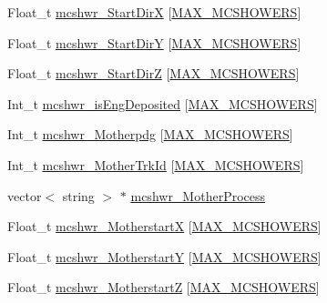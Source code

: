 \begin{DoxyCompactItemize}
\item 
Float\-\_\-t \hyperlink{classanatree_a5050cb067504527dce05bec84de07428}{mcshwr\-\_\-\-Start\-Dir\-X} \mbox{[}\hyperlink{anatree__core__v09410002_8h_ac14fc9ac3bf074dc1c2ab53cbd26449b}{M\-A\-X\-\_\-\-M\-C\-S\-H\-O\-W\-E\-R\-S}\mbox{]}
\item 
Float\-\_\-t \hyperlink{classanatree_ad3391ce32e4a90cdeb01c63329406b8d}{mcshwr\-\_\-\-Start\-Dir\-Y} \mbox{[}\hyperlink{anatree__core__v09410002_8h_ac14fc9ac3bf074dc1c2ab53cbd26449b}{M\-A\-X\-\_\-\-M\-C\-S\-H\-O\-W\-E\-R\-S}\mbox{]}
\item 
Float\-\_\-t \hyperlink{classanatree_ab1ff6e4ea73ecd3d03f175beedcc5cef}{mcshwr\-\_\-\-Start\-Dir\-Z} \mbox{[}\hyperlink{anatree__core__v09410002_8h_ac14fc9ac3bf074dc1c2ab53cbd26449b}{M\-A\-X\-\_\-\-M\-C\-S\-H\-O\-W\-E\-R\-S}\mbox{]}
\item 
Int\-\_\-t \hyperlink{classanatree_a8de3877a5bb9030ba734c43d767e1fd9}{mcshwr\-\_\-is\-Eng\-Deposited} \mbox{[}\hyperlink{anatree__core__v09410002_8h_ac14fc9ac3bf074dc1c2ab53cbd26449b}{M\-A\-X\-\_\-\-M\-C\-S\-H\-O\-W\-E\-R\-S}\mbox{]}
\item 
Int\-\_\-t \hyperlink{classanatree_ae3d5dea22be9d6c134892c5740d6e69a}{mcshwr\-\_\-\-Motherpdg} \mbox{[}\hyperlink{anatree__core__v09410002_8h_ac14fc9ac3bf074dc1c2ab53cbd26449b}{M\-A\-X\-\_\-\-M\-C\-S\-H\-O\-W\-E\-R\-S}\mbox{]}
\item 
Int\-\_\-t \hyperlink{classanatree_a1d2bbd71659519ca59c05097c92e8572}{mcshwr\-\_\-\-Mother\-Trk\-Id} \mbox{[}\hyperlink{anatree__core__v09410002_8h_ac14fc9ac3bf074dc1c2ab53cbd26449b}{M\-A\-X\-\_\-\-M\-C\-S\-H\-O\-W\-E\-R\-S}\mbox{]}
\item 
vector$<$ string $>$ $\ast$ \hyperlink{classanatree_a8eca5519b33722cef863970e40a1826a}{mcshwr\-\_\-\-Mother\-Process}
\item 
Float\-\_\-t \hyperlink{classanatree_aee48afcf4efb09f982471bc1a7c63680}{mcshwr\-\_\-\-Motherstart\-X} \mbox{[}\hyperlink{anatree__core__v09410002_8h_ac14fc9ac3bf074dc1c2ab53cbd26449b}{M\-A\-X\-\_\-\-M\-C\-S\-H\-O\-W\-E\-R\-S}\mbox{]}
\item 
Float\-\_\-t \hyperlink{classanatree_a225c96218a29f49753c83810dcc7bf55}{mcshwr\-\_\-\-Motherstart\-Y} \mbox{[}\hyperlink{anatree__core__v09410002_8h_ac14fc9ac3bf074dc1c2ab53cbd26449b}{M\-A\-X\-\_\-\-M\-C\-S\-H\-O\-W\-E\-R\-S}\mbox{]}
\item 
Float\-\_\-t \hyperlink{classanatree_a046518d1902f351e8e145e803b5e6781}{mcshwr\-\_\-\-Motherstart\-Z} \mbox{[}\hyperlink{anatree__core__v09410002_8h_ac14fc9ac3bf074dc1c2ab53cbd26449b}{M\-A\-X\-\_\-\-M\-C\-S\-H\-O\-W\-E\-R\-S}\mbox{]}

\end{DoxyCompactItemize}
